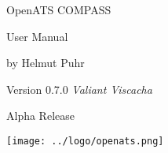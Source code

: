 \documentclass[oneside,a4paper]{memoir}
\begin{document}
\firmlists
\midsloppy
\raggedbottom


%

\frontmatter
\pagestyle{empty}


\vspace*{\fill}
\begin{center}
\HUGE\textsf{OpenATS COMPASS}\par
\end{center}

\begin{center}
\Huge\textsf{User Manual}\par
\end{center}
\begin{center}
\normalsize\textsf{by Helmut Puhr}\par
\medskip
\normalsize\textsf{Version 0.7.0 \textit{Valiant Viscacha}}\par\textsf{Alpha Release}\par
\end{center}
\vspace*{\fill}
\begin{center}
\texttt{[image: ../logo/openats.png]}
\setlength{\droptitle}{0pt}%
\end{center}
\clearpage

\cleardoublepage

\pagestyle{headings}

\setupshorttoc
\tableofcontents
\clearpage
\setupparasubsecs
\setupmaintoc
\tableofcontents
\setlength{\unitlength}{1pt}
\clearpage
\listoffigures
\clearpage
\listoftables
\clearpage







%










\end{document}
